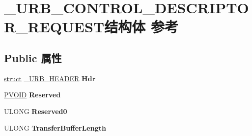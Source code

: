\hypertarget{struct___u_r_b___c_o_n_t_r_o_l___d_e_s_c_r_i_p_t_o_r___r_e_q_u_e_s_t}{}\section{\+\_\+\+U\+R\+B\+\_\+\+C\+O\+N\+T\+R\+O\+L\+\_\+\+D\+E\+S\+C\+R\+I\+P\+T\+O\+R\+\_\+\+R\+E\+Q\+U\+E\+S\+T结构体 参考}
\label{struct___u_r_b___c_o_n_t_r_o_l___d_e_s_c_r_i_p_t_o_r___r_e_q_u_e_s_t}
\subsection*{Public 属性}
\begin{DoxyCompactItemize}
\item 
\mbox{\label{struct___u_r_b___c_o_n_t_r_o_l___d_e_s_c_r_i_p_t_o_r___r_e_q_u_e_s_t_a9294e4a8b3faeb5fdc36d9337d89c5fc}} 
\hyperlink{interfacestruct}{struct} \hyperlink{struct___u_r_b___h_e_a_d_e_r}{\+\_\+\+U\+R\+B\+\_\+\+H\+E\+A\+D\+ER} {\bfseries Hdr}
\item 
\mbox{\label{struct___u_r_b___c_o_n_t_r_o_l___d_e_s_c_r_i_p_t_o_r___r_e_q_u_e_s_t_a49108ed21df6681528287e9faf3ef4f6}} 
\hyperlink{interfacevoid}{P\+V\+O\+ID} {\bfseries Reserved}
\item 
\mbox{\label{struct___u_r_b___c_o_n_t_r_o_l___d_e_s_c_r_i_p_t_o_r___r_e_q_u_e_s_t_a732f1fdb82d4518db47c17a41d895d32}} 
U\+L\+O\+NG {\bfseries Reserved0}
\item 
\mbox{\label{struct___u_r_b___c_o_n_t_r_o_l___d_e_s_c_r_i_p_t_o_r___r_e_q_u_e_s_t_a21661ff50adba7a30740a3b69100e0e3}} 
U\+L\+O\+NG {\bfseries Transfer\+Buffer\+Length}
\item 
\mbox{\label{struct___u_r_b___c_o_n_t_r_o_l___d_e_s_c_r_i_p_t_o_r___r_e_q_u_e_s_t_a90bb37fc878182c2fc3ee06234939f53}} 

\end{DoxyCompactItemize}
